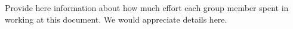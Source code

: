 Provide here information about how much effort each group member spent in working at this document. We would appreciate details here.
